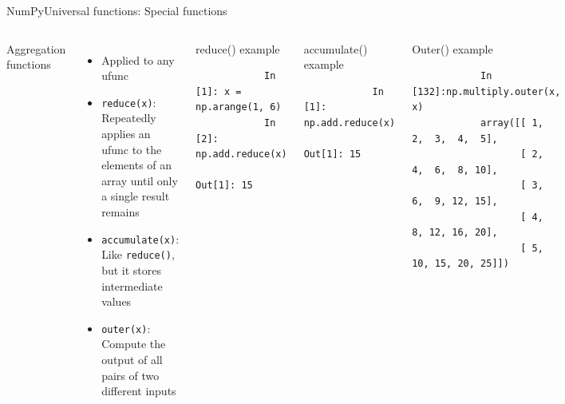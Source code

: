 \documentclass[10pt,compress]{beamer} %
\begin{document}
\begin{frame}[fragile]{NumPy}{Universal functions: Special functions}
	\vspace{-0.2cm} 
	\begin{columns}
			Aggregation functions
			\begin{itemize}
				\item Applied to any ufunc
				\item \texttt{reduce(x)}: Repeatedly applies an ufunc to the elements of an array until only a single result remains
				\item \texttt{accumulate(x)}: Like \texttt{reduce()}, but it stores intermediate values
				\item \texttt{outer(x)}: Compute the output of all pairs of two different inputs
			\end{itemize}

		\begin{exampleblock}{\footnotesize{reduce() example}}
		\vspace{-0.2cm} 
			\begin{lstlisting}
			In [1]: x = np.arange(1, 6)
			In [2]: np.add.reduce(x)
			Out[1]: 15
			\end{lstlisting}
		\vspace{-0.2cm} 
		\end{exampleblock}

		\begin{exampleblock}{\footnotesize{accumulate() example}}
		\vspace{-0.2cm} 
			\begin{lstlisting}
			In [1]: np.add.reduce(x)
			Out[1]: 15
			\end{lstlisting}
		\vspace{-0.2cm} 
		\end{exampleblock}

		\begin{exampleblock}{\footnotesize{Outer() example}}
		\vspace{-0.2cm} 
			\begin{lstlisting}
			In [132]:np.multiply.outer(x, x)
			array([[ 1,  2,  3,  4,  5], 
			       [ 2,  4,  6,  8, 10], 
			       [ 3,  6,  9, 12, 15], 
			       [ 4,  8, 12, 16, 20], 
			       [ 5, 10, 15, 20, 25]])
			\end{lstlisting}
		\vspace{-0.2cm} 
		\end{exampleblock}
	\end{columns}
\end{frame}
\end{document}
